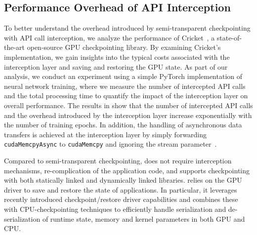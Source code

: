 \subsection{Performance Overhead of API Interception}%
To better understand the overhead introduced by semi-transparent checkpointing with API call interception, we analyze the performance of Cricket~\cite{eiling2022cricket}, a state-of-the-art open-source GPU checkpointing library.
By examining Cricket's implementation, we gain insights into the typical costs associated with the interception layer and saving and restoring the GPU state.
As part of our analysis, we conduct an experiment using a simple PyTorch implementation of neural network training, where we measure the number of intercepted API calls and the total processing time to quantify the impact of the interception layer on overall performance.
The results in  show that the number of intercepted API calls and the overhead introduced by the interception layer increase exponentially with the number of training epochs.
In addition, the handling of asynchronous data transfers is achieved at the interception layer by simply forwarding \texttt{cudaMemcpyAsync} to \texttt{cudaMemcpy} and ignoring the stream parameter~\cite{eiling2022cricket}.

 Compared to semi-transparent checkpointing, \sys does not require interception mechanisms, re-complication of the application code, and supports checkpointing with both statically linked and dynamically linked libraries. \sys relies on the GPU driver to save and restore the state of applications.
In particular, it leverages recently introduced checkpoint/restore driver capabilities and combines these with CPU-checkpointing techniques to efficiently handle serialization and de-serialization of runtime state, memory and kernel parameters in both GPU and CPU.
